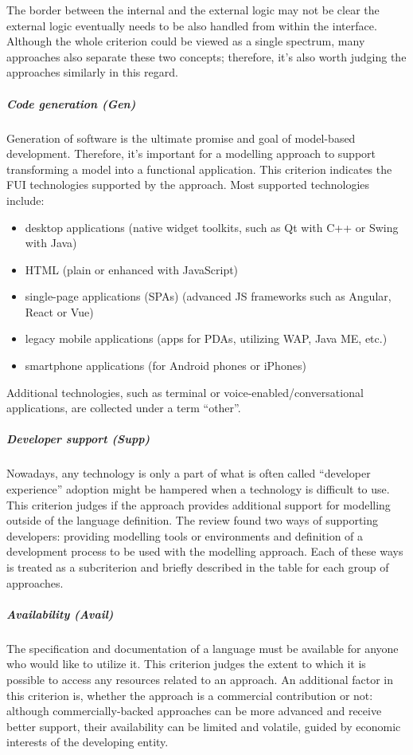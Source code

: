 The border between the internal and the external logic may not be clear\,\textemdash\,the external logic eventually needs to be also handled from within the interface.
Although the whole criterion could be viewed as a single spectrum, many approaches also separate these two concepts;
therefore, it's also worth judging the approaches similarly in this regard.

\subparagraph{Code generation (Gen)}
Generation of software is the ultimate promise and goal of model-based development.
Therefore, it's important for a modelling approach to support transforming a model into a functional application.
This criterion indicates the FUI technologies supported by the approach.
Most supported technologies include:
\begin{itemize}
    \item desktop applications (native widget toolkits, such as Qt with C++ or Swing with Java)
    \item HTML (plain or enhanced with JavaScript)
    \item single-page applications (SPAs) (advanced JS frameworks such as Angular, React or Vue)
    \item legacy mobile applications (apps for PDAs, utilizing WAP, Java ME, etc.)
    \item smartphone applications (for Android phones or iPhones)
\end{itemize}
Additional technologies, such as terminal or voice-enabled/conversational applications, are collected under a term \enquote{other}.

\subparagraph{Developer support (Supp)}
Nowadays, any technology is only a part of what is often called \enquote{developer experience}\,\textemdash\,adoption might be hampered when a technology is difficult to use.
This criterion judges if the approach provides additional support for modelling outside of the language definition.
The review found two ways of supporting developers: providing modelling tools or environments and definition of a development process to be used with the modelling approach.
Each of these ways is treated as a subcriterion and briefly described in the table for each group of approaches.

\subparagraph{Availability (Avail)}
The specification and documentation of a language must be available for anyone who would like to utilize it.
This criterion judges the extent to which it is possible to access any resources related to an approach.
An additional factor in this criterion is, whether the approach is a commercial contribution or not: although commercially-backed approaches can be more advanced and receive better support, their availability can be limited and volatile, guided by economic interests of the developing entity.

